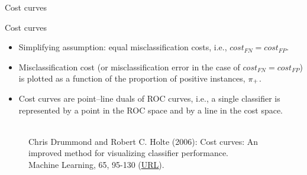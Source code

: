 \begin{vbframe}{Cost curves}

\end{vbframe}


\begin{vbframe}{Cost curves}

\begin{footnotesize}

\begin{itemize}
  \item Simplifying assumption: equal misclassification costs, i.e., 
  $cost_{FN} = cost_{FP}$.
  \item Misclassification cost (or misclassification error in the case of 
  $cost_{FN} = cost_{FP}$) is plotted as a function of the proportion of 
  positive instances, $\pi_{+}$.
  \item Cost curves are point–line duals of ROC curves, i.e., a single 
  classifier is represented by a point in the ROC space and by a line in the 
  cost space.
\end{itemize}

\end{footnotesize}

\begin{figure}
  \centering
  \tiny
  \\Chris Drummond and Robert C. Holte (2006): Cost curves: An improved
  method for visualizing classifier performance. \\Machine Learning, 65, 95-130 
  (\href{https://www.semanticscholar.org/paper/Cost-curves\%3A-An-improved-method-for  -visualizing-Drummond-Holte/71708ce984e0896e7383435913547e770572410e}
  {\underline{URL}}).
\end{figure}


\end{vbframe}
